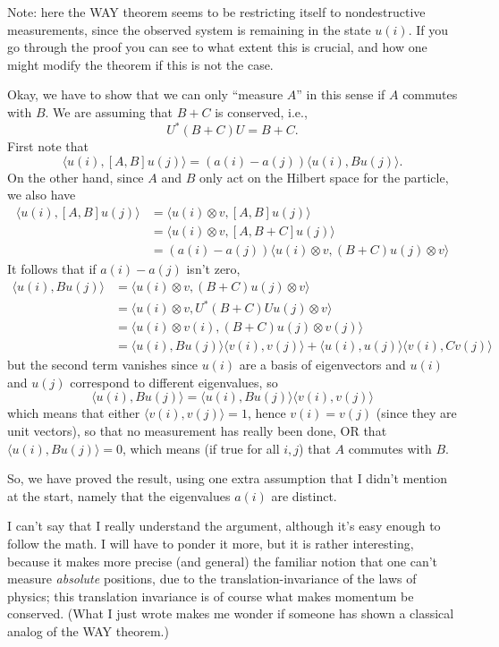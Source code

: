 \documentclass{article}
\begin{document}
Note: here the WAY theorem seems to be restricting itself to
nondestructive measurements, since the observed system is remaining in
the state \(u(i)\). If you go through the proof you can see to what
extent this is crucial, and how one might modify the theorem if this is
not the case.

Okay, we have to show that we can only ``measure \(A\)'' in this sense
if \(A\) commutes with \(B\). We are assuming that \(B + C\) is
conserved, i.e., \[U^*(B + C)U = B + C.\] First note that
\[\langle u(i), [A,B] u(j)\rangle = (a(i)-a(j)) \langle u(i), Bu(j)\rangle.\]
On the other hand, since \(A\) and \(B\) only act on the Hilbert space
for the particle, we also have
\[\begin{aligned}\langle u(i),[A,B]u(j) \rangle &= \langle u(i)\otimes v,[A,B]u(j) \rangle \\ &= \langle u(i)\otimes v,[A,B+C]u(j) \rangle \\ &= (a(i)-a(j))\langle u(i)\otimes v,(B+C)u(j)\otimes v \rangle\end{aligned}\]
It follows that if \(a(i)-a(j)\) isn't zero,
\[\begin{aligned}\langle u(i),Bu(j) \rangle &= \langle u(i)\otimes v,(B+C)u(j)\otimes v \rangle \\ &= \langle u(i)\otimes v, U^*(B+C)Uu(j)\otimes v \rangle \\ &= \langle u(i)\otimes v(i),(B+C)u(j)\otimes v(j) \rangle \\ &= \langle u(i),Bu(j) \rangle\langle v(i),v(j) \rangle + \langle u(i),u(j) \rangle\langle v(i),Cv(j) \rangle\end{aligned}\]
but the second term vanishes since \(u(i)\) are a basis of eigenvectors
and \(u(i)\) and \(u(j)\) correspond to different eigenvalues, so
\[\langle u(i), Bu(j)\rangle = \langle u(i), Bu(j)\rangle \langle v(i), v(j)\rangle\]
which means that either \(\langle v(i), v(j)\rangle = 1\), hence
\(v(i) = v(j)\) (since they are unit vectors), so that no measurement
has really been done, OR that \(\langle u(i), B u(j)\rangle = 0\), which
means (if true for all \(i,j\)) that \(A\) commutes with \(B\).

So, we have proved the result, using one extra assumption that I didn't
mention at the start, namely that the eigenvalues \(a(i)\) are distinct.

I can't say that I really understand the argument, although it's easy
enough to follow the math. I will have to ponder it more, but it is
rather interesting, because it makes more precise (and general) the
familiar notion that one can't measure \emph{absolute} positions, due to
the translation-invariance of the laws of physics; this translation
invariance is of course what makes momentum be conserved. (What I just
wrote makes me wonder if someone has shown a classical analog of the WAY
theorem.)
\end{document}
